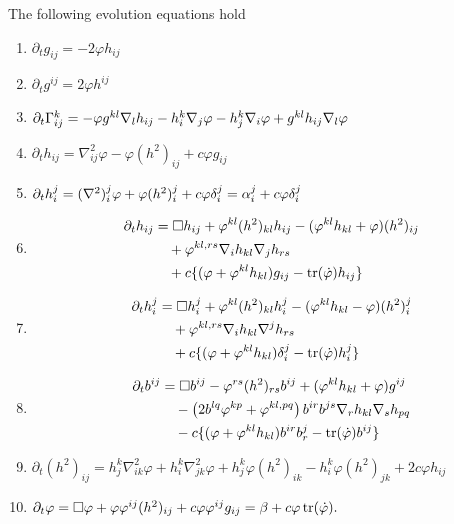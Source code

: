 \documentclass{amsart}
\begin{document}
\begin{lemma}
\label{lem:evolution}
The following evolution equations hold
\begin{enumerate}
\item \label{eq:delt_metric} $\partial_tg_{ij} = -2\varphi h_{ij}$
\item \label{eq:delt_inversemetric} $\partial_t g^{ij} = 2\varphi h^{ij}$
\item \label{eq:delt_christoffel} $\partial_t {\Gamma}^{k}_{ij} = -\varphi g^{kl} \nabla_l h_{ij} - h^k_i \nabla_j \varphi - h^k_j \nabla_i \varphi + g^{kl} h_{ij} \nabla_l \varphi$
\item \label{eq:delt_sff} $\partial_t h_{ij} = \nabla^2_{ij} \varphi - \varphi(h^2)_{ij} + c \varphi g_{ij}$
\item \label{eq:delt_weingarten} $\partial_t h_i^j = (\nabla^2)^j_i\varphi + \varphi(h^2)_i^j + c \varphi\delta_i^j = \alpha^j_i + c \varphi\delta_i^j$
\item \label{eq:delt_sff_box} \begin{align*}
\partial_t h_{ij} &= \Box h_{ij} + \varphi^{kl} (h^2)_{kl} h_{ij} - (\varphi^{kl}h_{kl} + \varphi) (h^2)_{ij} \\
& \quad + \varphi^{kl,rs}\nabla_i h_{kl}\nabla_j h_{rs} \\
& \quad + c \{(\varphi + \varphi^{kl}h_{kl}) g_{ij} - \operatorname{tr}(\dot{\varphi}) h_{ij}\}
\end{align*}
\item \label{eq:delt_weingarten_box} \begin{align*}
\partial_t h_i^j &= \Box h_i^j + \varphi^{kl} (h^2)_{kl} h_i^j - (\varphi^{kl}h_{kl} - \varphi) (h^2)_i^j \\
& \quad + \varphi^{kl,rs}\nabla_i h_{kl}\nabla^j h_{rs} \\
& \quad + c \{(\varphi + \varphi^{kl}h_{kl}) \delta_i^j - \operatorname{tr}(\dot{\varphi}) h_i^j\}
\end{align*}
\item \label{eq:delt_inversesff} \begin{align*}
\partial_t b^{ij} &= \Box b^{ij} - \varphi^{rs} (h^2)_{rs} b^{ij} + (\varphi^{kl}h_{kl} + \varphi) g^{ij} \\
& \quad - \left(2b^{lq}\varphi^{kp} + \varphi^{kl,pq}\right) b^{ir}b^{js} \nabla_r h_{kl} \nabla_s h_{pq} \\
& \quad - c \{(\varphi + \varphi^{kl}h_{kl}) b^{ir}b^{j}_{r} - \operatorname{tr}(\dot{\varphi}) b^{ij}\}
\end{align*}
\item \label{eq:delt_squaredsff} $\partial_t (h^2)_{ij} = h^k_j \nabla^2_{ik} \varphi + h^k_i \nabla^2_{jk} \varphi + h^k_j \varphi(h^2)_{ik} - h^k_i \varphi(h^2)_{jk} + 2c\varphi h_{ij}$
\item \label{eq:delt_speed} $\partial_t \varphi = \Box \varphi + \varphi\varphi^{ij}(h^2)_{ij} + c \varphi\varphi^{ij}g_{ij} = \beta + c\varphi\operatorname{tr}(\dot{\varphi}).$
\end{enumerate}
\end{lemma}
\end{document}
